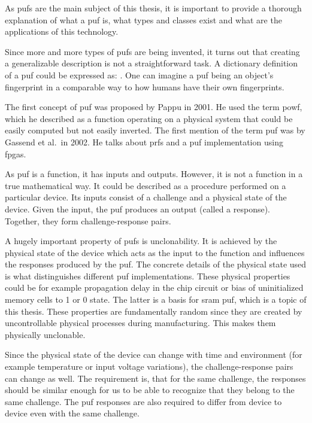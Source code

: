 As \glspl{puf} are the main subject of this thesis, it is important to provide a thorough explanation of what a \gls{puf} is, what types and classes exist and what are
the applications of this technology.

Since more and more types of \glspl{puf} are being invented, it turns out that creating a generalizable description is not a straightforward task. A dictionary definition of a \gls{puf} could be expressed as: . One can imagine a \gls{puf} being an object's fingerprint in a comparable way to how humans have their own fingerprints.\cite{Maes2013}

The first concept of \gls{puf} was proposed by Pappu in 2001. He used the term \gls{powf}, which he described as a function operating on a physical system that could be easily computed but not easily inverted.\cite{Pappu2001} The first mention of the term \gls{puf} was by Gassend et al.\ in 2002. He talks about \glspl{prf} and a \gls{puf} implementation using \glspl{fpga}.\cite{Gassend2002}

As \gls{puf} is a function, it has inputs and outputs. However, it is not a function in a true mathematical way. It could be described as a procedure performed on a particular device. Its inputs consist of a challenge and a physical state of the device. Given the input, the \gls{puf} produces an output (called a response). Together, they form challenge-response pairs.   

A hugely important property of \glspl{puf} is unclonability. It is achieved by the physical state of the device which acts as the input to the function and influences the responses produced by the \gls{puf}. The concrete details of the physical state used is what distinguishes different \gls{puf} implementations. These physical properties could be for example propagation delay in the chip circuit or bias of uninitialized memory cells to 1 or 0 state. The latter is a basis for \gls{sram} \gls{puf}, which is a topic of this thesis. These properties are fundamentally random since they are created by uncontrollable physical processes during manufacturing. This makes them physically unclonable.

Since the physical state of the device can change with time and environment (for example temperature or input voltage variations), the challenge-response pairs can change as well. The requirement is, that for the same challenge, the responses should be similar enough for us to be able to recognize that they belong to the same challenge. The \gls{puf} responses are also required to differ from device to device even with the same challenge.\cite{Kodytek2020}

